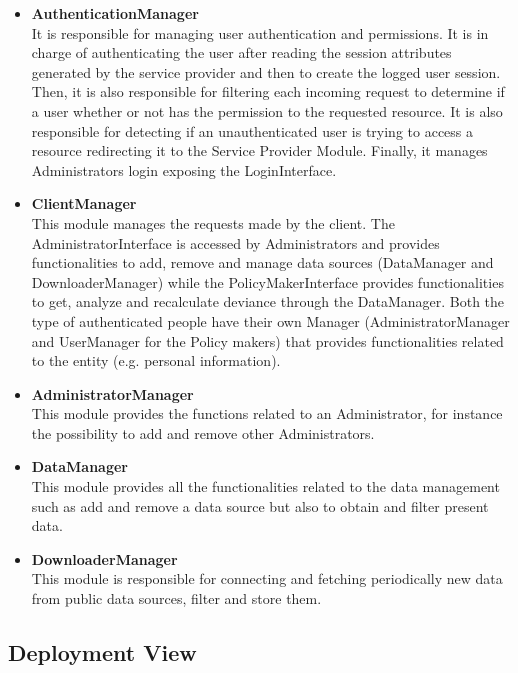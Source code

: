 \begin{itemize}
    \item \textbf{AuthenticationManager}\\
    It is responsible for managing user authentication and permissions. It is in charge of authenticating the user after reading the session attributes generated by the service provider and then to create the logged user session. Then, it is also responsible for filtering each incoming request to determine if a user whether or not has the permission to the requested resource. It is also responsible for detecting if an unauthenticated user is trying to access a resource redirecting it to the Service Provider Module.
    Finally, it manages Administrators login exposing the LoginInterface.
    
    \item \textbf{ClientManager}\\
    This module manages the requests made by the client. The AdministratorInterface is accessed by Administrators and provides functionalities to add, remove and manage data sources (DataManager and DownloaderManager) while the PolicyMakerInterface provides functionalities to get, analyze and recalculate deviance through the DataManager. Both the type of authenticated people have their own Manager (AdministratorManager and UserManager for the Policy makers) that provides functionalities related to the entity (e.g. personal information).
    
    \item \textbf{AdministratorManager}\\
    This module provides the functions related to an Administrator, for instance the possibility to add and remove other Administrators.
    
    \item \textbf{DataManager}\\
    This module provides all the functionalities related to the data management such as add and remove a data source but also to obtain and filter present data.
    
    \item \textbf{DownloaderManager}\\
    This module is responsible for connecting and fetching periodically new data from public data sources, filter and store them. 

\end{itemize}

\newpage
\subsection{Deployment View}

